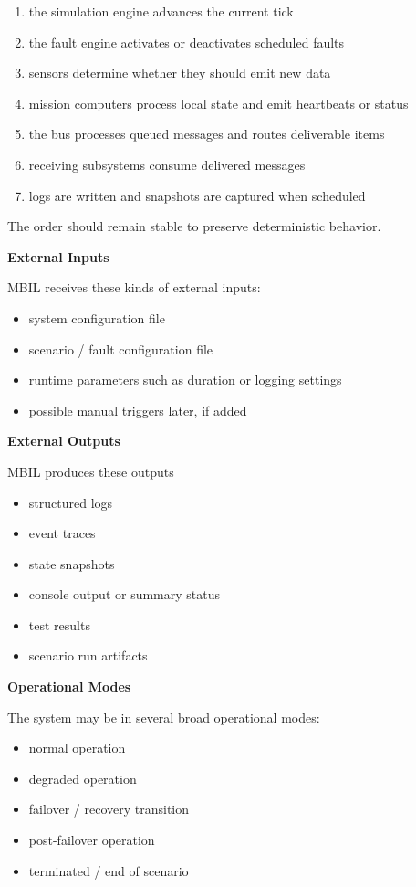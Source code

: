 \documentclass[12pt]{article}
\begin{document}
\begin{enumerate}
    \item the simulation engine advances the current tick
    \item the fault engine activates or deactivates scheduled faults
    \item sensors determine whether they should emit new data
    \item mission computers process local state and emit heartbeats or status
    \item the bus processes queued messages and routes deliverable items
    \item receiving subsystems consume delivered messages
    \item logs are written and snapshots are captured when scheduled
\end{enumerate}

The order should remain stable to preserve deterministic behavior.

\textbf{External Inputs}

MBIL receives these kinds of external inputs:
\begin{itemize}[leftmargin=*]
    \item system configuration file
    \item scenario / fault configuration file
    \item runtime parameters such as duration or logging settings
    \item possible manual triggers later, if added
\end{itemize}

\textbf{External Outputs}

MBIL produces these outputs
\begin{itemize}[leftmargin=*]
    \item structured logs
    \item event traces
    \item state snapshots
    \item console output or summary status
    \item test results
    \item scenario run artifacts
\end{itemize}

\textbf{Operational Modes}

The system may be in several broad operational modes:
\begin{itemize}[leftmargin=*]
    \item normal operation
    \item degraded operation
    \item failover / recovery transition
    \item post-failover operation
    \item terminated / end of scenario
\end{itemize}
\end{document}
